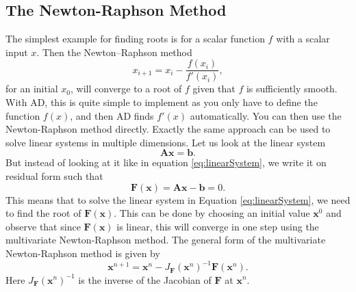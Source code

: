 \subsection{The Newton-Raphson Method}
The simplest example for finding roots is for a scalar function $f$ with a scalar input $x$. Then the Newton--Raphson method
\begin{equation*}
    x_{i+1} = x_i - \frac{f(x_i)}{f'(x_i)},
\end{equation*}
for an initial $x_0$, will converge to a root of $f$ given that $f$ is sufficiently smooth. With AD, this is quite simple to implement as you only have to define the function $f(x)$, and then AD finds $f'(x)$ automatically. You can then use the Newton-Raphson method directly. Exactly the same approach can be used to solve linear systems in multiple dimensions. Let us look at the linear system 
\begin{equation}
    \textbf{A}\boldsymbol{x} = \textbf{b}.
    \label{eq:linearSystem}
\end{equation}
But instead of looking at it like in equation \eqref{eq:linearSystem}, we write it on residual form such that
\begin{equation*}
	\boldsymbol{F}(\boldsymbol{x}) = \textbf{A}\boldsymbol{x} - \boldsymbol{b} = 0 .
\end{equation*}
This means that to solve the linear system in Equation \eqref{eq:linearSystem}, we need to find the root of $\boldsymbol{F}(\boldsymbol{x})$. This can be done by choosing an initial value $\boldsymbol{x}^0$ and observe that since $\boldsymbol{F}(\boldsymbol{x})$ is linear, this will converge in one step using the multivariate Newton-Raphson method. The general form of the multivariate Newton-Raphson method is given by
\begin{equation}
	\boldsymbol{x}^{n+1} = \boldsymbol{x}^n - J_{\boldsymbol{F}}  (\boldsymbol{x}^n)^{-1} \boldsymbol{F}(\boldsymbol{x}^n).
    \label{eq:newtonRaphsonVector}
\end{equation}
Here $J_{\boldsymbol{F}}  (\boldsymbol{x}^n)^{-1}$ is the inverse of the Jacobian of $\boldsymbol{F}$ at $\boldsymbol{x}^n$. 


